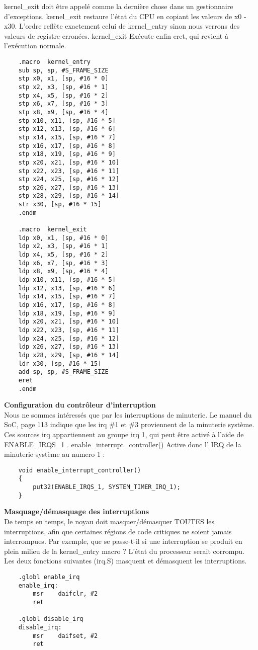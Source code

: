 \documentclass[12pt,a4paper,oneside]{book}
\begin{document}
kernel\_exit doit être appelé comme la dernière chose dans un gestionnaire d'exceptions. kernel\_exit restaure l'état du CPU en copiant les valeurs de x0 - x30. L'ordre reflète exactement celui de kernel\_entry sinon nous verrons des valeurs de registre erronées. kernel\_exit Exécute enfin eret, qui revient à l'exécution normale.
\begin{lstlisting}
	.macro	kernel_entry
	sub	sp, sp, #S_FRAME_SIZE
	stp	x0, x1, [sp, #16 * 0]
	stp	x2, x3, [sp, #16 * 1]
	stp	x4, x5, [sp, #16 * 2]
	stp	x6, x7, [sp, #16 * 3]
	stp	x8, x9, [sp, #16 * 4]
	stp	x10, x11, [sp, #16 * 5]
	stp	x12, x13, [sp, #16 * 6]
	stp	x14, x15, [sp, #16 * 7]
	stp	x16, x17, [sp, #16 * 8]
	stp	x18, x19, [sp, #16 * 9]
	stp	x20, x21, [sp, #16 * 10]
	stp	x22, x23, [sp, #16 * 11]
	stp	x24, x25, [sp, #16 * 12]
	stp	x26, x27, [sp, #16 * 13]
	stp	x28, x29, [sp, #16 * 14]
	str	x30, [sp, #16 * 15] 
	.endm

	.macro	kernel_exit
	ldp	x0, x1, [sp, #16 * 0]
	ldp	x2, x3, [sp, #16 * 1]
	ldp	x4, x5, [sp, #16 * 2]
	ldp	x6, x7, [sp, #16 * 3]
	ldp	x8, x9, [sp, #16 * 4]
	ldp	x10, x11, [sp, #16 * 5]
	ldp	x12, x13, [sp, #16 * 6]
	ldp	x14, x15, [sp, #16 * 7]
	ldp	x16, x17, [sp, #16 * 8]
	ldp	x18, x19, [sp, #16 * 9]
	ldp	x20, x21, [sp, #16 * 10]
	ldp	x22, x23, [sp, #16 * 11]
	ldp	x24, x25, [sp, #16 * 12]
	ldp	x26, x27, [sp, #16 * 13]
	ldp	x28, x29, [sp, #16 * 14]
	ldr	x30, [sp, #16 * 15] 
	add	sp, sp, #S_FRAME_SIZE		
	eret
	.endm
\end{lstlisting}

\textbf{Configuration du contrôleur d'interruption}\\
Nous ne sommes intéressés que par les interruptions de minuterie. Le manuel du SoC, page 113 indique que les irq \#1 et \#3 proviennent de la minuterie système. Ces sources irq appartiennent au groupe irq 1, qui peut être activé à l'aide de ENABLE\_IRQS\_1 . enable\_interrupt\_controller() Active donc l' IRQ de la minuterie système au numero 1 :
\begin{lstlisting}
	void enable_interrupt_controller()
	{
    	put32(ENABLE_IRQS_1, SYSTEM_TIMER_IRQ_1);
	}
\end{lstlisting}

\textbf{Masquage/démasquage des interruptions}\\
De temps en temps, le noyau doit masquer/démasquer TOUTES les interruptions, afin que certaines régions de code critiques ne soient jamais interrompues. Par exemple, que se passe-t-il si une interruption se produit en plein milieu de la kernel\_entry macro ? L'état du processeur serait corrompu.\\
Les deux fonctions suivantes (irq.S) masquent et démasquent les interruptions.
\begin{lstlisting}
	.globl enable_irq
	enable_irq:
    	msr    daifclr, #2
    	ret

	.globl disable_irq
	disable_irq:
    	msr    daifset, #2
        ret
\end{lstlisting}
\end{document}
